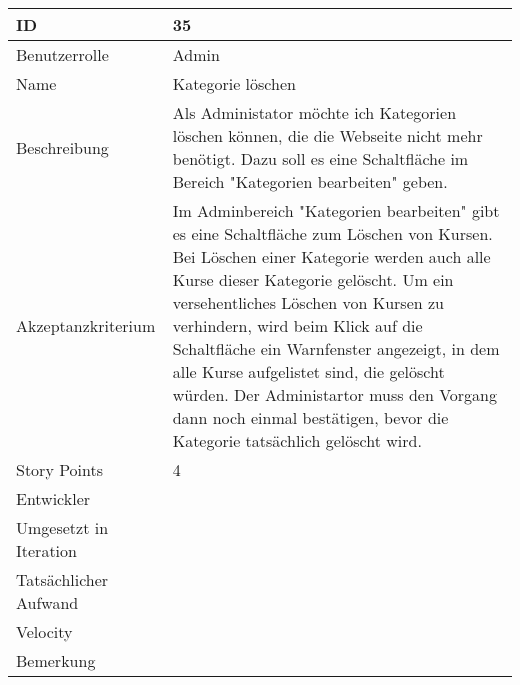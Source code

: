 \begin{tabularx}{\textwidth}{|p{}|X|}
	\hline
	ID & 35\\
	\hline
	Benutzerrolle & Admin\\
	\hline
	Name & Kategorie löschen\\
	\hline
	Beschreibung & Als Administator möchte ich Kategorien löschen können, die die Webseite nicht mehr benötigt. Dazu soll es eine Schaltfläche im Bereich "Kategorien bearbeiten" geben.\\
	\hline
	Akzeptanzkriterium & Im Adminbereich "Kategorien bearbeiten" gibt es eine Schaltfläche zum Löschen von Kursen. Bei Löschen einer Kategorie werden auch alle Kurse dieser Kategorie gelöscht. Um ein versehentliches Löschen von Kursen zu verhindern, wird beim Klick auf die Schaltfläche ein Warnfenster angezeigt, in dem alle Kurse aufgelistet sind, die gelöscht würden. Der Administartor muss den Vorgang dann noch einmal bestätigen, bevor die Kategorie tatsächlich gelöscht wird.\\
	\hline
	Story Points & 4 \\
	\hline
	Entwickler & \\
	\hline
	Umgesetzt in Iteration & \\
	\hline
	Tatsächlicher Aufwand & \\
	\hline
	Velocity & \\
	\hline
	Bemerkung & \\
	\hline
\end{tabularx}
\vspace{20pt}
